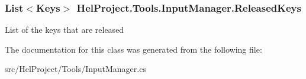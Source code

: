 \subsubsection[{Released\+Keys}]{\setlength{\rightskip}{0pt plus 5cm}List$<$Keys$>$ Hel\+Project.\+Tools.\+Input\+Manager.\+Released\+Keys\hspace{0.3cm}{\ttfamily [get]}}\label{class_hel_project_1_1_tools_1_1_input_manager_a5add5e83ca9d72a3f1bc89e76572fd66}


List of the keys that are released 



The documentation for this class was generated from the following file\+:\begin{DoxyCompactItemize}
\item 
src/\+Hel\+Project/\+Tools/Input\+Manager.\+cs\end{DoxyCompactItemize}
